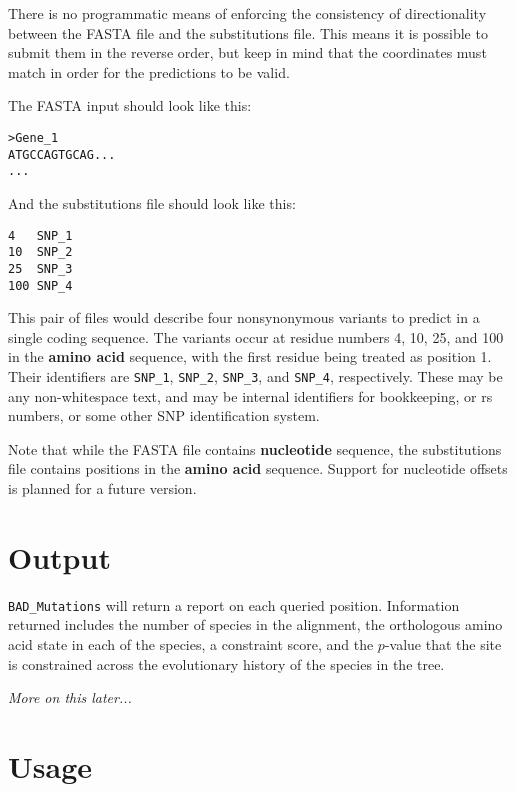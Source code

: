 \documentclass[12pt]{article}
\newcommand{\BM}{\texttt{BAD\_Mutations} }
\begin{document}
\par There is no programmatic means of enforcing the consistency of
directionality between the FASTA file and the substitutions file. This means it
is possible to submit them in the reverse order, but keep in mind that the
coordinates must match in order for the predictions to be valid.

\par The FASTA input should look like this:
\begin{Verbatim}[frame=single, fontsize=\small, rulecolor=\color{gray}]
>Gene_1
ATGCCAGTGCAG...
...
\end{Verbatim}
\newpage
And the substitutions file should look like this:
\begin{Verbatim}[frame=single, fontsize=\small, rulecolor=\color{gray}]
4   SNP_1
10  SNP_2
25  SNP_3
100 SNP_4
\end{Verbatim}

\par This pair of files would describe four nonsynonymous variants to predict
in a single coding sequence. The variants occur at residue numbers 4, 10, 25,
and 100 in the \textbf{amino acid} sequence, with the first residue being
treated as position 1. Their identifiers are \texttt{SNP\_1}, \texttt{SNP\_2},
\texttt{SNP\_3}, and \texttt{SNP\_4}, respectively. These may be any
non-whitespace text, and may be internal identifiers for bookkeeping, or
rs numbers, or some other SNP identification system.

\par Note that while the FASTA file contains \textbf{nucleotide} sequence, the
substitutions file contains positions in the \textbf{amino acid} sequence.
Support for nucleotide offsets is planned for a future version.

\section*{Output}
\par \BM will return a report on each queried position. Information returned
includes the number of species in the alignment, the orthologous amino acid
state in each of the species, a constraint score, and the $p$-value that the
site is constrained across the evolutionary history of the species in the tree.

\par \textit{More on this later...}
\section*{Usage}
\end{document}
